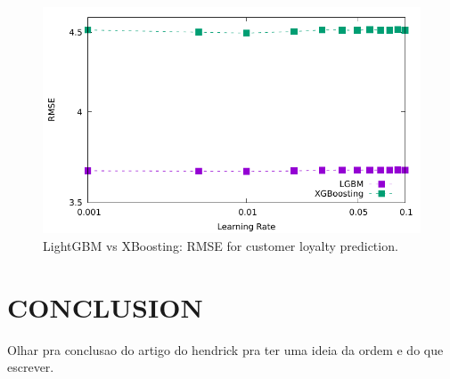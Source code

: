 \documentclass[letterpaper, 10 pt, conference]{ieeeconf}  %
\begin{document}
\begin{figure}[thpb]
\centering
\includegraphics[scale=0.7]{Figures/learningrate_rmse_lgbm2.pdf}
\caption{LightGBM vs XBoosting: RMSE for customer loyalty prediction.}
\label{Xboosting}
\end{figure}



\section{CONCLUSION}
Olhar pra conclusao do artigo do hendrick pra ter uma ideia da ordem e do que escrever.


\addtolength{\textheight}{-12cm}   %












\end{document}
